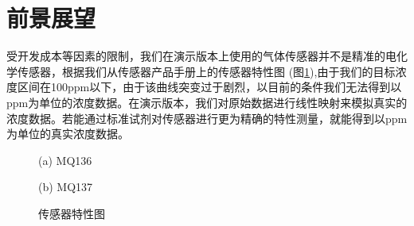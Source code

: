 \documentclass[degree=course]{sjtuthesis}
\begin{document}
\section{前景展望}
受开发成本等因素的限制，我们在演示版本上使用的气体传感器并不是精准的电化学传感器，根据我们从传感器产品手册上的传感器特性图 (图\ref{PIC:MINI}),由于我们的目标浓度区间在100ppm以下，由于该曲线突变过于剧烈，以目前的条件我们无法得到以ppm为单位的浓度数据。在演示版本，我们对原始数据进行线性映射来模拟真实的浓度数据。若能通过标准试剂对传感器进行更为精确的特性测量，就能得到以ppm为单位的真实浓度数据。
\begin{figure}[H]
\centering
\begin{minipage}{0.4\linewidth}

    \noindent{}
	\centerline{(a) MQ136}
\end{minipage}
\hfill
\begin{minipage}{0.4\linewidth}

    \noindent{}
	\centerline{(b) MQ137}
\end{minipage}

\caption{传感器特性图}\label{PIC:MINI}

\end{figure}
\end{document}
